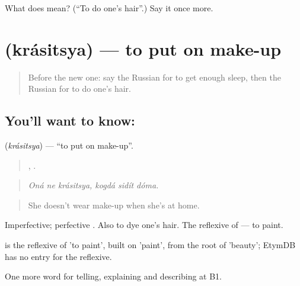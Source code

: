 \begin{tcolorbox}[breakable,colback=teal!4,colframe=teal!35!black,title={Before you move on}]
What does  mean? (\textquotedblleft{}To do one's hair\textquotedblright{}.) Say it once more.
\end{tcolorbox}
\section[\texorpdfstring{\ru{краситься} (krásitsya)}{краситься (krásitsya)}]{ (krásitsya) — to put on make-up}

\label{lesson:RU-C534-krasitsya}



\begin{quote}
Before the new one: say the Russian for to get enough sleep, then the Russian for to do one's hair.
\end{quote}

\subsection*{You'll want to know: }
\textbf{} (\emph{krásitsya}) — \textquotedblleft{}to put on make-up\textquotedblright{}.

\begin{quote}
  ,   .
\end{quote}

\begin{quote}
\emph{Oná ne krásitsya, kogdá sidít dóma.}
\end{quote}

\begin{quote}
She doesn't wear make-up when she's at home.
\end{quote}

Imperfective; perfective . Also to dye one's hair. The reflexive of \emph{} — to paint.

\begin{cousinweb}
\emph{} is the reflexive of \emph{} 'to paint', built on \emph{} 'paint', from the root of \emph{} 'beauty'; EtymDB has no entry for the reflexive.
\end{cousinweb}

\begin{grammarlens}[title={What you've built}]
One more word for telling, explaining and describing at B1.
\end{grammarlens}

